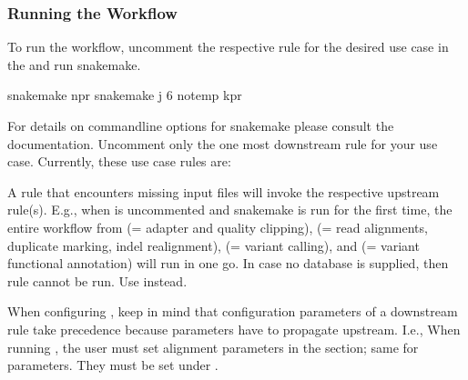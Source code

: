 \documentclass[letterpaper,10pt,english]{sphinxhowto}
\begin{document}
\subsubsection{Running the Workflow}
\label{\detokenize{index:running-the-workflow}}
To run the workflow, un\sphinxhyphen{}comment the respective rule for the desired use case in the  and run snakemake.

\begin{sphinxVerbatim}[commandchars=\\\{\}]
\PYGZdl{} snakemake \textendash{}npr
\PYGZdl{} snakemake \textendash{}j 6 \PYGZhy{}\PYGZhy{}notemp \PYGZhy{}kpr
\end{sphinxVerbatim}

For details on commandline options for snakemake please consult the  documentation. Un\sphinxhyphen{}comment only the one most downstream rule for your use case. Currently, these use case rules are:

\begin{sphinxVerbatim}[commandchars=\\\{\}]
\end{sphinxVerbatim}

A rule that encounters missing input files will invoke the respective upstream rule(s). E.g., when  is uncommented and snakemake is run for the first time, the entire workflow from  (= adapter and quality clipping),  (= read alignments, duplicate marking, indel realignment),  (= variant calling), and  (= variant functional annotation) will run in one go.
In case no  database is supplied, then rule  cannot be run. Use  instead.

When configuring , keep in mind that configuration parameters of a downstream rule take precedence because parameters have to propagate upstream. I.e., When running , the user must set alignment parameters in the  section; same for  parameters. They must be set under .
\end{document}
